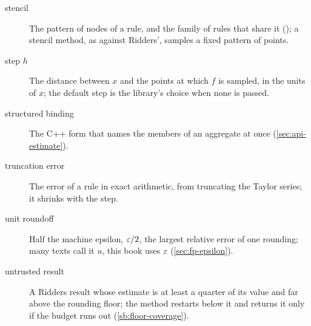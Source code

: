 \begin{description}
  \item[stencil] The pattern of nodes of a rule, and the family of rules that share it (); a
    stencil method, as against Ridders', samples a fixed pattern of points.
  \item[step $h$] The distance between $x$ and the points at which $f$ is sampled, in the units of $x$; the default
    step is the library's choice when none is passed.
  \item[structured binding] The C++ form  that names the members of an
    aggregate at once (\cref{sec:api-estimate}).
  \item[truncation error] The error of a rule in exact arithmetic, from truncating the Taylor series; it shrinks
    with the step.
  \item[unit roundoff] Half the machine epsilon, $\varepsilon / 2$, the largest relative error of one rounding; many
    texts call it $u$, this book uses $\varepsilon$ (\cref{sec:fp-epsilon}).
  \item[untrusted result] A Ridders result whose estimate is at least a quarter of its value and far above the
    rounding floor; the method restarts below it and returns it only if the budget runs out
    (\cref{sb:floor-coverage}).
\end{description}
